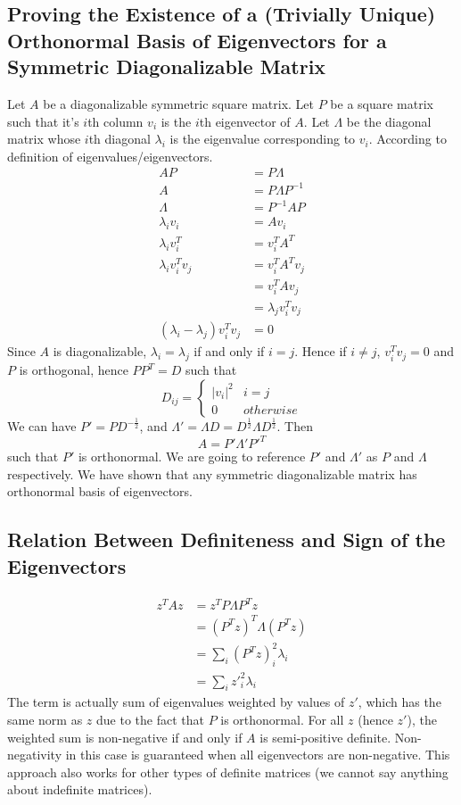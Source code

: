 \documentclass{article}
\numberwithin{equation}{subsection}
\begin{document}
\subsection{Proving the Existence of a (Trivially Unique) Orthonormal Basis of Eigenvectors for a Symmetric Diagonalizable Matrix}
Let $A$ be a diagonalizable symmetric square matrix. Let $P$ be a square matrix such that it's $i$th column $v_i$ is the $i$th eigenvector of $A$. Let $\Lambda$ be the diagonal matrix whose $i$th diagonal $\lambda_i$ is the eigenvalue corresponding to $v_i$. According to definition of eigenvalues/eigenvectors.
\begin{align}
    AP &= P\Lambda\\
    A &= P\Lambda P^{-1}\\
    \Lambda &= P^{-1}AP\\
    \lambda_iv_i &= Av_i\\
    \lambda_iv_i^T &= v_i^TA^T\\
    \lambda_iv_i^Tv_j &= v_i^TA^Tv_j\\
    &= v_i^TAv_j\\
    &= \lambda_jv_i^Tv_j\\
    (\lambda_i-\lambda_j)v_i^Tv_j &= 0
\end{align}
Since $A$ is diagonalizable, $\lambda_i=\lambda_j$ if and only if $i=j$. Hence if $i \neq j$, $v_i^Tv_j = 0$ and $P$ is orthogonal, hence 
$PP^T = D$ such that 
\begin{equation}
D_{ij} = \begin{cases}
    |v_i|^2 & i = j\\
    0 & otherwise
\end{cases}
\end{equation}
We can have $P' = PD^{-\frac{1}{2}}$, and $\Lambda' = \Lambda D = D^{\frac{1}{2}} \Lambda D^{\frac{1}{2}}$. Then
\begin{equation}
    A = P'\Lambda'P'^T 
\end{equation}
such that $P'$ is orthonormal. We are going to reference $P'$ and $\Lambda'$ as $P$ and $\Lambda$ respectively. We have shown that any symmetric diagonalizable matrix has orthonormal basis of eigenvectors.
\subsection{Relation Between Definiteness and Sign of the Eigenvectors}
\begin{align}
    z^TAz &= z^TP\Lambda P^Tz\\
    &= (P^Tz)^T\Lambda (P^Tz)\\
    &= \sum_i (P^Tz)_i^2 \lambda_i\\
    &= \sum_i z'_i^2 \lambda_i
\end{align}
The term is actually sum of eigenvalues weighted by values of $z'$, which has the same norm as $z$ due to the fact that $P$ is orthonormal. For all $z$ (hence $z'$), the weighted sum is non-negative if and only if $A$ is semi-positive definite. Non-negativity in this case is guaranteed when all eigenvectors are non-negative. This approach also works for other types of definite matrices (we cannot say anything about indefinite matrices). 
\end{document}

